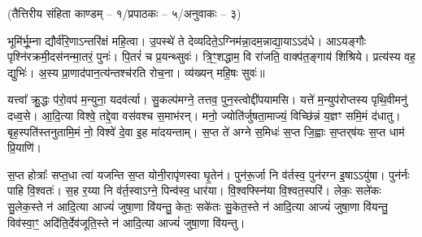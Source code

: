 \vspace{-1ex}
\centerline{\normalsize (तैत्तिरीय संहिता काण्डम् – १/प्रपाठकः – ५/अनुवाकः – ३)}

भूमि॑र्भू॒म्ना द्यौर्व॑रि॒णाऽन्तरि॑क्षं महि॒त्वा। उ॒पस्थे॑ ते देव्यदिते॒ऽग्नि\-म॑न्ना॒दम॒न्नाद्या॒याऽऽद॑धे।
आऽयङ्गौः पृश्नि॑रक्रमी॒\-दस॑नन्मा॒तरं॒ पुनः॑। पि॒तरं॑ च प्र॒यन्थ्सुवः॑।
त्रि॒ꣳ॒शद्धाम॒ वि रा॑जति॒ वाक्प॑त॒ङ्गाय॑ शिश्रिये। प्रत्य॑स्य वह॒ द्युभिः॑। अ॒स्य प्रा॒णाद॑पान॒त्य॑न्तश्च॑रति रोच॒ना।
व्य॑ख्यन् महि॒षः सुवः॑॥

यत्त्वा᳚ क्रु॒द्धः प॑रो॒वप॑ म॒न्युना॒ यदव॑र्त्या। सु॒कल्प॑मग्ने॒ तत्तव॒ पुन॒स्त्वोद्दी॑पयामसि।
यत्ते॑ म॒न्युप॑रोप्तस्य पृथि॒वीमनु॑ दध्व॒से। आ॒दि॒त्या विश्वे॒ तद्दे॒वा वस॑वश्च स॒माभ॑रन्।
मनो॒ ज्योति॑र्जुषता॒माज्यं॒ विच्छि॑न्नं य॒ज्ञꣳ समि॒मं द॑धातु। बृह॒स्पति॑स्तनुतामि॒मं नो॒ विश्वे॑ दे॒वा इ॒ह मा॑दयन्ताम्।
 स॒प्त ते॑ अग्ने स॒मिधः॑ स॒प्त जि॒ह्वाः स॒प्तर्‌ष॑यः स॒प्त धाम॑ प्रि॒याणि॑। 

स॒प्त होत्राः᳚ सप्त॒धा त्वा॑ यजन्ति स॒प्त योनी॒रापृ॑णस्वा घृ॒तेन॑। पुन॑रू॒र्जा नि व॑र्तस्व॒ पुन॑रग्न इ॒षाऽऽयु॑षा। पुन॑र्नः पाहि वि॒श्वतः॑। स॒ह र॒य्या नि व॑र्त॒स्वाऽग्ने॒ पिन्व॑स्व॒ धार॑या। वि॒श्वफ्स्नि॑या वि॒श्वत॒स्परि॑। लेकः॒ सले॑कः सु॒लेक॒स्ते न॑ आदि॒त्या आज्यं॑ जुषा॒णा वि॑यन्तु॒ केतः॒ सके॑तः सु॒केत॒स्ते न॑ आदि॒त्या आज्यं॑ जुषा॒णा वि॑यन्तु॒ विव॑स्वा॒ꣳ॒ अदि॑ति॒र्देव॑जूति॒स्ते न॑ आदि॒त्या आज्यं॑ जुषा॒णा वि॑यन्तु।

